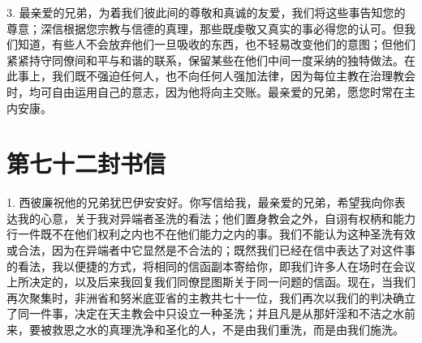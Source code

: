 3. 最亲爱的兄弟，为着我们彼此间的尊敬和真诚的友爱，我们将这些事告知您的尊意；深信根据您宗教与信德的真理，那些既虔敬又真实的事必得您的认可。但我们知道，有些人不会放弃他们一旦吸收的东西，也不轻易改变他们的意图；但他们紧紧持守同僚间和平与和谐的联系，保留某些在他们中间一度采纳的独特做法。在此事上，我们既不强迫任何人，也不向任何人强加法律，因为每位主教在治理教会时，均可自由运用自己的意志，因为他将向主交账。最亲爱的兄弟，愿您时常在主内安康。\par



\section{第七十二封书信}

\par

\par

1. 西彼廉祝他的兄弟犹巴伊安安好。你写信给我，最亲爱的兄弟，希望我向你表达我的心意，关于我对异端者圣洗的看法；他们置身教会之外，自诩有权柄和能力行一件既不在他们权利之内也不在他们能力之内的事。我们不能认为这种圣洗有效或合法，因为在异端者中它显然是不合法的；既然我们已经在信中表达了对这件事的看法，我以便捷的方式，将相同的信函副本寄给你，即我们许多人在场时在会议上所决定的，以及后来我回复我们同僚昆图斯关于同一问题的信函。现在，当我们再次聚集时，非洲省和努米底亚省的主教共七十一位，我们再次以我们的判决确立了同一件事，决定在天主教会中只设立一种圣洗；并且凡是从那奸淫和不洁之水前来，要被救恩之水的真理洗净和圣化的人，不是由我们重洗，而是由我们施洗。\par


